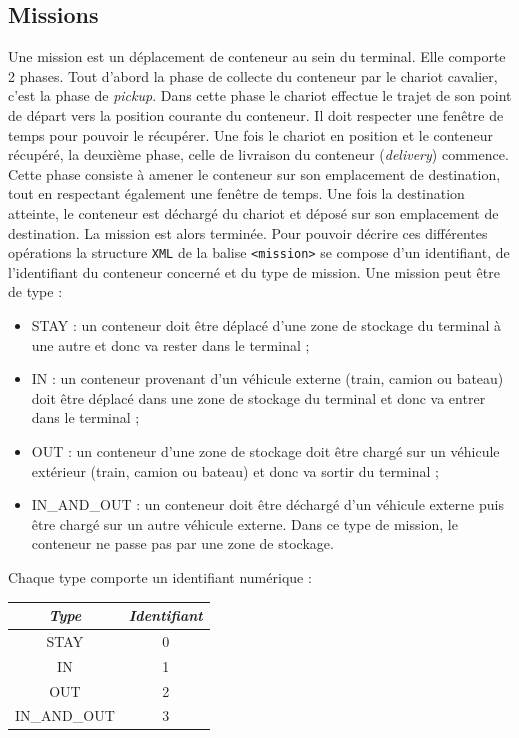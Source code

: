 \subsection{Missions}

Une mission est un déplacement de conteneur au sein du terminal. Elle comporte 2 phases. Tout d'abord la phase de collecte du conteneur par le chariot cavalier, c'est la phase de \textit{pickup}. Dans cette phase le chariot effectue le trajet de son point de départ vers la position courante du conteneur. Il doit respecter une fenêtre de temps pour pouvoir le récupérer. Une fois le chariot en position et le conteneur récupéré, la deuxième phase, celle de livraison du conteneur (\textit{delivery}) commence. Cette phase consiste à amener le conteneur sur son emplacement de destination, tout en respectant également une fenêtre de temps. Une fois la destination atteinte, le conteneur est déchargé du chariot et déposé sur son emplacement de destination. La mission est alors terminée. Pour pouvoir décrire ces différentes opérations la structure \verb!XML! de la balise \verb!<mission>! se compose d'un identifiant, de l'identifiant du conteneur concerné et du type de mission. Une mission peut être de type :
\begin{itemize}
 \item STAY : un conteneur doit être déplacé d'une zone de stockage du terminal à une autre et donc va rester dans le terminal ;
 \item IN : un conteneur provenant d'un véhicule externe (train, camion ou bateau) doit être déplacé dans une zone de stockage du terminal et donc va entrer dans le terminal ;
 \item OUT : un conteneur d'une zone de stockage doit être chargé sur un véhicule extérieur (train, camion ou bateau) et donc va sortir du terminal ;
 \item IN\_AND\_OUT : un conteneur doit être déchargé d'un véhicule externe puis être chargé sur un autre véhicule externe. Dans ce type de mission, le conteneur ne passe pas par une zone de stockage.
\end{itemize}

Chaque type comporte un identifiant numérique :

\begin{center}
\footnotesize
\begin{tabular}{|c|c|}
  \hline
  \textbf{\textit{Type}} & \textbf{\textit{Identifiant}}\tabularnewline
  \hline
  STAY & 0 \tabularnewline
  \hline
  IN & 1 \tabularnewline
  \hline
  OUT & 2 \tabularnewline
  \hline
  IN\_AND\_OUT & 3 \tabularnewline
  \hline
\end{tabular}
\end{center}

